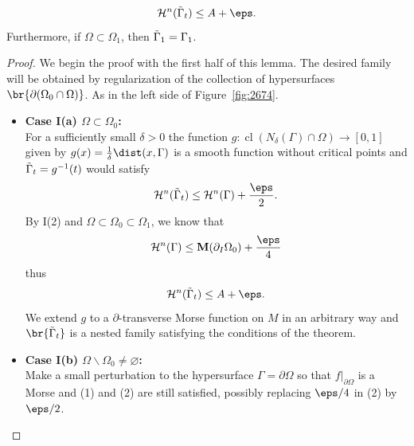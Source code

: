 \begin{lemma}
\begin{enumerate}
        \begin{equation*}
            \mathcal{H}^n(\Tilde{\Gamma}_t) \leq A + \eps.
        \end{equation*}
        Furthermore, if $\Omega \subset \Omega_1$, then $\Tilde{\Gamma}_1 = \Gamma_1$.
    \end{enumerate}
    \begin{proof}
        We begin the proof with the first half of this lemma.
        The desired family will be obtained by regularization of the collection of hypersurfaces $\br{\partial(\Omega_0\cap \Omega)}$. As in the left side of Figure~\ref{fig:2674}.
        \begin{itemize}
            \item \textbf{Case I(a) $\Omega\subset \Omega_0$:}\\
            For a sufficiently small $\delta > 0$ the function $g: \operatorname{cl}(N_{\delta}(\Gamma)\cap \Omega)\to [0, 1]$ given by $g(x) = \frac{1}{\delta}\dist(x, \Gamma)$ is a smooth function without critical points and $\Tilde{\Gamma}_t = g^{-1}(t)$ would satisfy
            \begin{equation*}
                \mathcal{H}^n(\Tilde{\Gamma}_t) \leq \mathcal{H}^n(\Gamma) + \frac{\eps}{2}.
            \end{equation*}
            By I(2) and $\Omega \subset \Omega_0 \subset \Omega_1$, we know that
            \begin{equation*}
                \mathcal{H}^n(\Gamma) \leq \mathbf{M}(\partial_I\Omega_0) + \frac{\eps}{4}
            \end{equation*}
            thus
            \begin{equation*}
                \mathcal{H}^n(\Tilde{\Gamma}_t) \leq A + \eps.
            \end{equation*}
            We extend $g$ to a $\partial$-transverse Morse function on $M$ in an arbitrary way and $\br{\Tilde{\Gamma}_t}$ is a nested family satisfying the conditions of the theorem.
            \item \textbf{Case I(b) $\Omega\backslash \Omega_0 \neq \varnothing$:}\\
            Make a small perturbation to the hypersurface $\Gamma = \partial\Omega$ so that $f|_{\partial\Omega}$ is a Morse and (1) and (2) are still satisfied, possibly replacing $\eps/4$ in (2) by $\eps/2$.


\end{itemize}
\end{proof}
\end{lemma}
